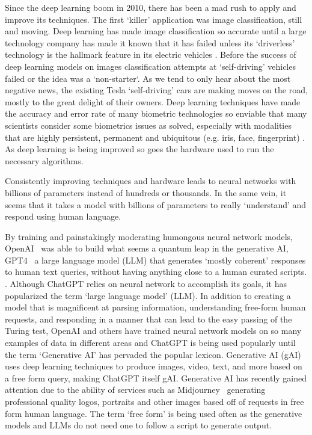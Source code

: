 Since the deep learning boom in 2010, there has been a mad rush to apply and improve its techniques.
The first `killer' application was image classification, still and moving.
Deep learning has made image classification so accurate until a large technology company has made it known that it has failed unless its `driverless' technology is the hallmark feature in its electric vehicles . 
Before the success of deep learning models on images classification attempts at `self-driving' vehicles failed or the idea was a `non-starter`.
As we tend to only hear about the most negative news, the existing Tesla `self-driving' cars are making moves on the road, mostly to the great delight of their owners.
Deep learning techniques have made the accuracy and error rate of many biometric technologies so enviable that many scientists consider some biometrics issues as solved, especially with modalities that are highly persistent, permanent and ubiquitous (e.g. iris, face, fingerprint) .
As deep learning is being improved so goes the hardware used to run the necessary algorithms.

Consistently improving techniques and hardware leads to neural networks with billions of parameters instead of hundreds or thousands.
In the same vein, it seems that it takes a model with billions of parameters to really `understand' and respond using human language.

By training and painstakingly moderating humongous neural network models, OpenAI~\cite{Bavarian:2022,Weng:2022} was able to build what seems a quantum leap in the generative AI, GPT4~\cite{OpenAI:202:gpt4} a large language model (LLM) that generates `mostly coherent' responses to human text queries, without having anything close to a human curated scripts. .
Although ChatGPT relies on neural network to accomplish its goals, it has popularized the term `large language model' (LLM).
In addition to creating a model that is magnificent at parsing information, understanding free-form human requests, and responding in a manner that can lead to the easy passing of the Turing test, OpenAI and others have trained neural network models on so many examples of data in different areas and ChatGPT is being used popularly until the term `Generative AI' has pervaded the popular lexicon.
Generative AI (gAI) uses deep learning techniques to produce images, video, text, and more based on a free form query, making ChatGPT itself gAI.
Generative AI has recently gained attention due to the ability of services such as Midjourney~\cite{Midjourney:2023} generating professional quality logos, portraits and other images based off of requests in free form human language.
The term `free form' is being used often as the generative models and LLMs do not need one to follow a script to generate output.

